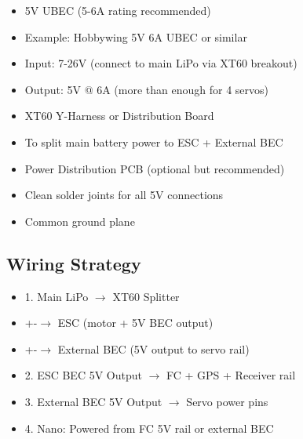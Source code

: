 \documentclass[11pt,letterpaper]{article}
\begin{document}
\begin{itemize}
  \item 5V UBEC (5-6A rating recommended)
  \item Example: Hobbywing 5V 6A UBEC or similar
  \item Input: 7-26V (connect to main LiPo via XT60 breakout)
  \item Output: 5V @ 6A (more than enough for 4 servos)
\end{itemize}

\begin{itemize}
  \item XT60 Y-Harness or Distribution Board
  \item To split main battery power to ESC + External BEC
\end{itemize}

\begin{itemize}
  \item Power Distribution PCB (optional but recommended)
  \item Clean solder joints for all 5V connections
  \item Common ground plane
\end{itemize}

\subsection{Wiring Strategy}

\begin{itemize}
  \item 1. Main LiPo $\rightarrow$ XT60 Splitter
  \item +-$\rightarrow$ ESC (motor + 5V BEC output)
  \item +-$\rightarrow$ External BEC (5V output to servo rail)
\end{itemize}

\begin{itemize}
  \item 2. ESC BEC 5V Output $\rightarrow$ FC + GPS + Receiver rail
\end{itemize}

\begin{itemize}
  \item 3. External BEC 5V Output $\rightarrow$ Servo power pins
\end{itemize}

\begin{itemize}
  \item 4. Nano: Powered from FC 5V rail or external BEC
\end{itemize}
\end{document}
